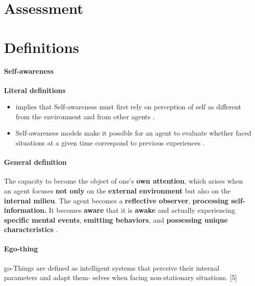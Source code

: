 \documentclass{article}
\begin{document}
	\section{Assessment}
		\citet{herbst-2017-metrics-and-benchmarks-for-self-aware-computing-systems}
		\citet{esterle-2017-assessing-self-awareness}
	\section{Definitions}
		\paragraph{Self-awareness}
		\textbf{Literal definitions}
		 \begin{itemize}
		 	\item implies that Self-awareness must first rely on perception of self as different from the environment and from other agents \cite{chatila-2018-toward-self-aware-robots}.
		 	\item Self-awareness models make it possible for an agent to evaluate whether faced situations at a given time correspond to previous experiences \cite{ravanbakhsh-2018-hierarchy-of-gans-for-learning-embodied-self-awareness-model}.
		 \end{itemize}
		
		\paragraph{General definition} The capacity to become the object of one’s \textbf{own attention}, which arises when an agent focuses \textbf{not only} on the \textbf{external environment} but also on the \textbf{internal milieu}. The agent becomes a \textbf{reflective observer}, \textbf{processing self-information.} It becomes \textbf{aware} that it is \textbf{awake} and actually experiencing \textbf{specific mental events}, \textbf{emitting behaviors}, and \textbf{possessing unique characteristics} \citet{morin-2006-levels-of-consciousness-and-self-awareness-a-comparison-and-integration-of-various-neurocognitive-views}.
		\paragraph{Ego-thing} go-Things are defined as intelligent
		systems that perceive their internal parameters and adapt them-
		selves when facing non-stationary situations. \citet{kanapram-2019-dynamic-bayesian-approach-for-decision-making-in-ego-things}[5]
\end{document}
